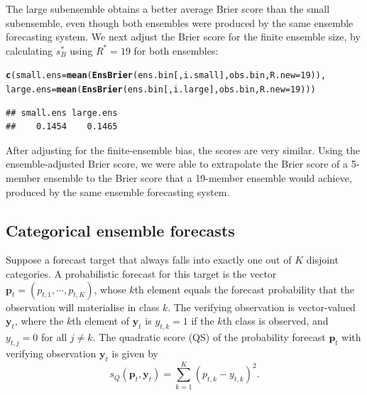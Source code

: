 \documentclass[article]{jss}\usepackage{graphicx, color}
\makeatletter
\newcommand{\hlfunctioncall}[1]{\textcolor[rgb]{0,0.501960784313725,0.752941176470588}{\textbf{#1}}}%
\newenvironment{kframe}{%
 \def\at@end@of@kframe{}%
 \ifinner\ifhmode%
  \def\at@end@of@kframe{\end{minipage}}%
  \begin{minipage}{\columnwidth}%
 \fi\fi%
 \def\FrameCommand##1{\hskip\@totalleftmargin \hskip-\fboxsep
 \colorbox{shadecolor}{##1}\hskip-\fboxsep
     \hskip-\linewidth \hskip-\@totalleftmargin \hskip\columnwidth}%
 \MakeFramed {\advance\hsize-\width
   \@totalleftmargin\z@ \linewidth\hsize
   \@setminipage}}%
 {\par\unskip\endMakeFramed%
 \at@end@of@kframe}
\newenvironment{knitrout}{}{} %
\makeatother
\begin{document}
%
The large subensemble obtains a better average Brier score than the small subensemble, even though both ensembles were produced by the same ensemble forecasting system.
We next adjust the Brier score for the finite ensemble size, by calculating $s_{B}^*$ using $R^*=19$ for both ensembles:
%
\begin{knitrout}
\color{fgcolor}\begin{kframe}
\begin{alltt}
\hlfunctioncall{c}(small.ens=\hlfunctioncall{mean}(\hlfunctioncall{EnsBrier}(ens.bin[, i.small], obs.bin, R.new=19)), 
  large.ens=\hlfunctioncall{mean}(\hlfunctioncall{EnsBrier}(ens.bin[, i.large], obs.bin, R.new=19)))
\end{alltt}
\begin{verbatim}
## small.ens large.ens 
##    0.1454    0.1465
\end{verbatim}
\end{kframe}
\end{knitrout}

%
After adjusting for the finite-ensemble bias, the scores are very similar. 
Using the ensemble-adjusted Brier score, we were able to extrapolate the Brier score of a 5-member ensemble to the Brier score that a 19-member ensemble would achieve, produced by the same ensemble forecasting system. 



\subsection{Categorical ensemble forecasts}

Suppose a forecast target that always falls into exactly one out of $K$ disjoint categories.
A probabilistic forecast for this target is the vector $\mathbf{p}_t = (p_{t,1}, \cdots, p_{t,K})$, whose $k$th element equals the forecast probability that the observation will materialise in class $k$.
The verifying observation is vector-valued $\mathbf{y}_t$, where the $k$th element of $\mathbf{y}_t$ is $y_{t,k}=1$ if the $k$th class is observed, and $y_{t,j}=0$ for all $j\neq k$. 
The quadratic score (QS) of the probability forecast $\mathbf{p}_t$ with verifying observation $\mathbf{y}_t$ is given by
%
\begin{equation}
s_{Q}(\mathbf{p}_t, \mathbf{y}_t) = \sum_{k=1}^K \left(p_{t,k} - y_{t,k}\right)^2.
\end{equation}
\end{document}
